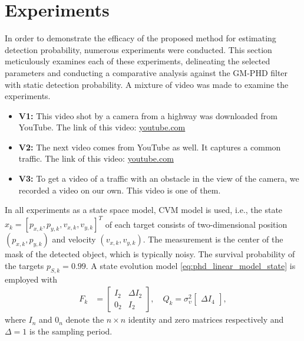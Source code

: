 \chapter{Experiments}
\label{sec:experiments}
In order to demonstrate the efficacy of the proposed method for estimating detection probability, numerous experiments were conducted. This section meticulously examines each of these experiments, delineating the selected parameters and conducting a comparative analysis against the GM-PHD filter with static detection probability.
A mixture of video was made to examine the experiments.
\begin{itemize}
  \item \textbf{V1:} This video shot by a camera from a highway was downloaded from YouTube. The link of this video: \href{https://www.youtube.com/watch?v=KBsqQez-O4w&t=30s&ab_channel=NickMartinez}{youtube.com}
  \item \textbf{V2:} The next video comes from YouTube as well. It captures a common traffic. The link of this video: \href{https://www.youtube.com/watch?v=7WFYiZersNc&ab_channel=AbdulMunaim}{youtube.com}
  \item \textbf{V3:} To get a video of a traffic with an obstacle in the view of the camera, we recorded a video on
  our own. This video is one of them.
\end{itemize}

In all experiments as a state space model, CVM model is used, i.e., the state $x_k = [p_{x,k},p_{y,k},v_{x,k},v_{y,k}]^T$ of each target consists of two-dimensional position $(p_{x,k},p_{y,k})$ and velocity $(v_{x,k},v_{y,k})$. The measurement is the center of the mask of the detected object, which is typically noisy. The survival probability of the targets $p_{S,k} = 0.99$. A state evolution model \eqref{eq:phd_linear_model_state} is employed with
\begin{align}
  F_k &=
  \begin{bmatrix}
    I_2 & \Delta I_2 \\
    0_2 & I_2
  \end{bmatrix},
  \quad
  Q_k = \sigma_{\upsilon}^2
  \begin{bmatrix}
    \Delta I_4
  \end{bmatrix},
\end{align}
where $I_n$ and $0_n$ denote the $n\times n$ identity and zero matrices respectively and $\Delta = 1$ is the sampling
period.

